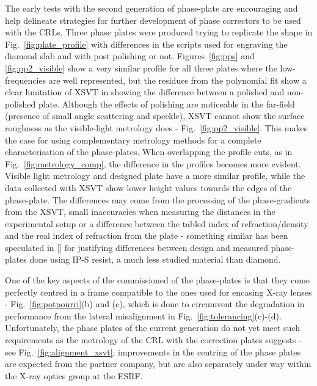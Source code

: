 \begin{refsection}
The early tests with the second generation of phase-plate are encouraging and help delineate strategies for further development of phase correctors to be used with the CRLs. Three phase plates were produced trying to replicate the shape in Fig.~\ref{fig:plate_profile} with differences in the scripts used for engraving the diamond slab and with post polishing or not. Figures~\ref{fig:pps} and \ref{fig:pp2_visible} show a very similar profile for all three plates where the low-frequencies are well represented, but the residues from the polynomial fit show a clear limitation of XSVT in showing the difference between a polished and non-polished plate. Although the effects of polishing are noticeable in the far-field (presence of small angle scattering and speckle), XSVT cannot show the surface roughness as the visible-light metrology does - Fig.~\ref{fig:pp2_visible}. This makes the case for using complementary metrology methods for a complete characterisation of the phase-plates. When overlapping the profile cuts, as in Fig.~\ref{fig:metrology_comp}, the difference in the profiles becomes more evident. Visible light metrology and designed plate have a more similar profile, while the data collected with XSVT show lower height values towards the edges of the phase-plate. The differences may come from the processing of the phase-gradients from the XSVT, small inaccuracies when measuring the distances in the experimental setup or a difference between the tabled index of refraction/density and the real index of refraction from the plate - something similar has been speculated in [\cite[\textit{§3.2}]{Seiboth2020}] for justifying differences between design and measured phase-plates done using IP-S resist, a much less studied material than diamond. 

One of the key aspects of the commissioned of the phase-plates is that they come perfectly centred in a frame compatible to the ones used for encasing X-ray lenses - Fig.~\ref{fig:potpourri}(b) and (c), which is done to circumvent the degradation in performance from the lateral misalignment in Fig.~\ref{fig:tolerancing}(c)-(d). Unfortunately, the phase plates of the current generation do not yet meet such requirements as the metrology of the CRL with the correction plates suggests - see Fig.~\ref{fig:alignment_xsvt}; improvements in the centring of the phase plates are expected from the partner company, but are also separately under way within the X-ray optics group at the ESRF. 


\end{refsection}
